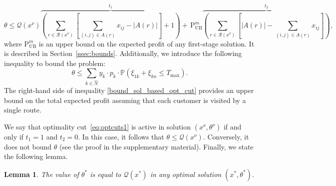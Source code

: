 \documentclass[11pt]{article}
\newtheorem{lemma}[theorem]{Lemma}
\theoremstyle{definition}
\begin{document}
\begin{equation}
\label{eq:optcuts1}
\theta \leq \mathcal{Q}(x^{\nu}) \overbrace{\left(\sum_{r \in \mathcal{R}(x^{\nu})} \left [ \sum_{(i,j) \in A(r)} x_{ij} - |A(r)|\right ] + 1 \right)}^{t_1} + \, \text{P}^m_{\text{UB}} \overbrace{\left(\sum_{r \in \mathcal{R}(x^{\nu})}\left [ |A(r)| - \sum_{(i,j) \in A(r)} x_{ij} \right ] \right)}^{t_2},
\end{equation}
where $\text{P}^m_{\text{UB}}$ is an upper bound on the expected profit of any first-stage solution. It is described in Section~\ref{ssec:bounds}.
%
Additionally, we introduce the following inequality to bound the problem:
%
\begin{equation}
\label{bound_sol_based_opt_cut}
\theta \leq \sum_{k \in \hat{N}} y_{k} \cdot p_k \cdot \mathbb{P}(\xi_{1k} + \xi_{kn} \leq T_{\max}).
\end{equation}
%
The right-hand side of inequality \eqref{bound_sol_based_opt_cut} provides an upper bound on the total expected profit assuming that each customer is visited by a single route.

We say that optimality cut~\eqref{eq:optcuts1} is active in solution $(x^\nu, \theta^\nu)$ if and only if $t_1 = 1$ and $t_2 = 0$. In this case, it follows that $\theta \leq \mathcal{Q}(x^{\nu})$.
Conversely, it does not bound $\theta$ (see the proof in the supplementary material). Finally, we state the following lemma.

\begin{lemma}
\label{lem:lemma2}
The value of $\theta^*$ is equal to $\mathcal{Q}(x^*)$ in any optimal solution $(x^*, \theta^*)$.
\end{lemma}
\end{document}

